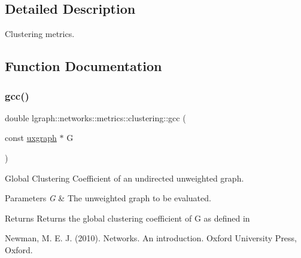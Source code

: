 \subsection{Detailed Description}
Clustering metrics. 

\subsection{Function Documentation}
\mbox{\label{namespacelgraph_1_1networks_1_1metrics_1_1clustering_aa2831ceb0814d7d3d2298b8c93d0b99f}} 
\subsubsection{\texorpdfstring{gcc()}{gcc()}\hspace{0.1cm}{\footnotesize\ttfamily [1/2]}}
{\footnotesize\ttfamily double lgraph\+::networks\+::metrics\+::clustering\+::gcc (\begin{DoxyParamCaption}\item[{const \hyperlink{classlgraph_1_1uxgraph}{uxgraph} $\ast$}]{G }\end{DoxyParamCaption})}



Global Clustering Coefficient of an undirected unweighted graph. 


\begin{DoxyParams}{Parameters}
{\em G} & The unweighted graph to be evaluated. \\
\hline
\end{DoxyParams}
\begin{DoxyReturn}{Returns}
Returns the global clustering coefficient of G as defined in \begin{DoxyVerb}Newman, M. E. J. (2010). Networks. An introduction. Oxford
University Press, Oxford.
\end{DoxyVerb}
 
\end{DoxyReturn}
\mbox{\label{namespacelgraph_1_1networks_1_1metrics_1_1clustering_a0bd5461cb7b39c35b3806749778ea073}} 
